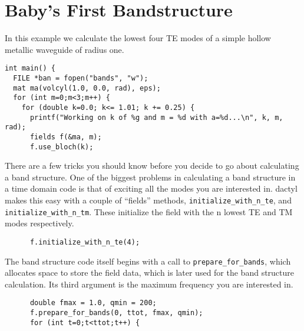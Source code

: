 \begin{comment}
/*
\end{comment}
\section{Baby's First Bandstructure}
\begin{comment}
*/
\end{comment}

\begin{comment}
#include <stdio.h>
#include <stdlib.h>
#include "dactyl.h"

double eps(const vec &) {
  return 1.0;
}
const int rad = 10;
const int ttot = 1500*rad;
\end{comment}

In this example we calculate the lowest four TE modes of a simple hollow
metallic waveguide of radius one.

\begin{verbatim}
int main() {
  FILE *ban = fopen("bands", "w");
  mat ma(volcyl(1.0, 0.0, rad), eps);
  for (int m=0;m<3;m++) {
    for (double k=0.0; k<= 1.01; k += 0.25) {
      printf("Working on k of %g and m = %d with a=%d...\n", k, m, rad);
      fields f(&ma, m);
      f.use_bloch(k);
\end{verbatim}

There are a few tricks you should know before you decide to go about
calculating a band structure.  One of the biggest problems in calculating a
band structure in a time domain code is that of exciting all the modes you
are interested in.  dactyl makes this easy with a couple of ``fields''
methods, \verb-initialize_with_n_te-, and \verb-initialize_with_n_tm-.
These initialize the field with the n lowest TE and TM modes respectively.

\begin{verbatim}
      f.initialize_with_n_te(4);
\end{verbatim}

The band structure code itself begins with a call to
\verb-prepare_for_bands-, which allocates space to store the field
data, which is later used for the band structure calculation.  Its third
argument is the maximum frequency you are interested in.

\begin{verbatim}
      double fmax = 1.0, qmin = 200;
      f.prepare_for_bands(0, ttot, fmax, qmin);
      for (int t=0;t<ttot;t++) {
\end{verbatim}

